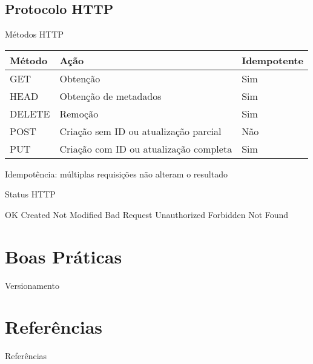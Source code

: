 \documentclass{beamer}
\begin{document}
\subsection{Protocolo HTTP}

\begin{frame}{Métodos HTTP}
  \begin{table}[]
  \begin{tabular}{@{}lll@{}}
  \toprule
  Método & Ação                                   & Idempotente \\ \midrule
  GET    & Obtenção                               & Sim         \\ \pause
  HEAD   & Obtenção de metadados                  & Sim         \\ \pause
  DELETE & Remoção                                & Sim         \\ \pause
  POST   & Criação sem ID ou atualização parcial  & Não         \\ \pause
  PUT    & Criação com ID ou atualização completa & Sim         \\ \bottomrule
  \end{tabular}
  \end{table}
  {\tiny Idempotência: múltiplas requisições não alteram o resultado}
\end{frame}

\begin{frame}{Status HTTP}
  \begin{outline}
     OK
     Created
     Not Modified
     Bad Request
     Unauthorized
     Forbidden
     Not Found
  \end{outline}
\end{frame}

\section{Boas Práticas}

\begin{frame}{Versionamento}
  
\end{frame}

\section{Referências}

\begin{frame}[allowframebreaks]{Referências}
  
\end{frame}
\end{document}
